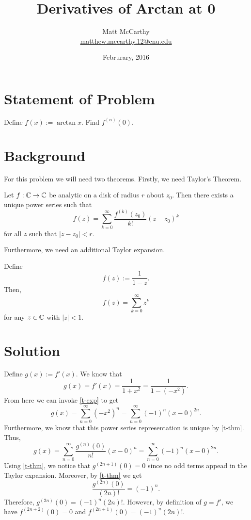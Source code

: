 \documentclass[notitlepage]{simple}
\author{Matt McCarthy\\\href{mailto:matthew.mccarthy.12@cnu.edu}{matthew.mccarthy.12@cnu.edu}}
\title{Derivatives of Arctan at 0}
\date{Februrary, 2016}
\begin{document}
\maketitle

\section{Statement of Problem}

Define $f(x):=\arctan x$.
Find $f^{(n)}(0)$.

\section{Background}

For this problem we will need two theorems.
Firstly, we need Taylor's Theorem.
\begin{thm}\label{t-thm}
	Let $f:\mathbb{C}\rightarrow\mathbb{C}$ be analytic on a disk of radius $r$ about $z_0$.
	Then there exists a unique power series such that
	\[
		f(z)=\sum_{k=0}^\infty \frac{f^{(k)}(z_0)}{k!}(z-z_0)^k
	\]
	for all $z$ such that $|z-z_0|<r$.
\end{thm}
Furthermore, we need an additional Taylor expansion.
\begin{thm}\label{t-exp}
	Define
	\[
		f(z):=\frac{1}{1-z}.
	\]
	Then,
	\[
		f(z)=\sum_{k=0}^\infty z^k
	\]
	for any $z\in\mathbb{C}$ with $|z|<1$.
\end{thm}

\section{Solution}

Define $g(x):=f'(x)$.
We know that
\[
	g(x)=f'(x)=\frac{1}{1+x^2} = \frac{1}{1-(-x^2)}.
\]
From here we can invoke \autoref{t-exp} to get
\[
	g(x) = \sum_{n=0}^\infty (-x^2)^n = \sum_{n=0}^\infty (-1)^n (x-0)^{2n}.
\]
Furthermore, we know that this power series representation is unique by \autoref{t-thm}.
Thus,
\[
	g(x)=\sum_{n=0}^\infty \frac{g^{(n)}(0)}{n!}(x-0)^n=\sum_{n=0}^\infty (-1)^n (x-0)^{2n}.
\]
Using \autoref{t-thm}, we notice that $g^{(2n+1)}(0)=0$ since no odd terms appead in the Taylor expansion.
Moreover, by \autoref{t-thm} we get
\[
	\frac{g^{(2n)}(0)}{(2n)!}=(-1)^n.
\]
Therefore, $g^{(2n)}(0)=(-1)^n(2n)!$.
However, by definition of $g=f'$, we have $f^{(2n+2)}(0)=0$ and $f^{(2n+1)}(0)=(-1)^n(2n)!$.
\end{document}
